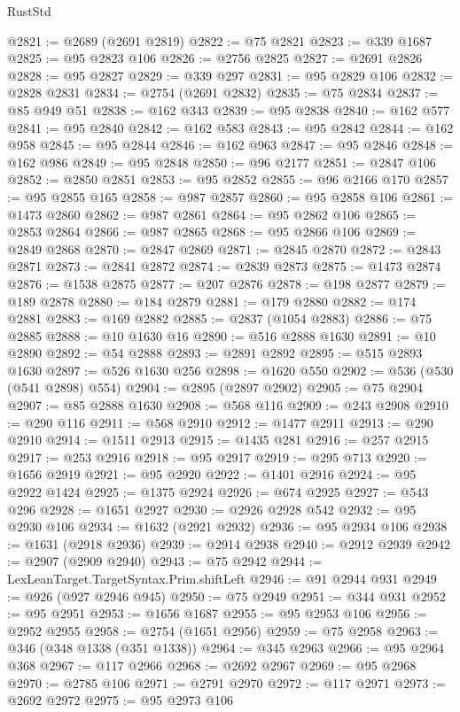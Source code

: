 \begin{lexlean}{RustStd}
\begin{coremodule}
{\begin{coremodule}
{{{{{{{{{{{{{{{{{{{{{{{{{{{{{{{{{{{{{{{@2821 := @2689 (@2691 @2819)
@2822 := @75 @2821
@2823 := @339 @1687
@2825 := @95 @2823 @106
@2826 := @2756 @2825
@2827 := @2691 @2826
@2828 := @95 @2827
@2829 := @339 @297
@2831 := @95 @2829 @106
@2832 := @2828 @2831
@2834 := @2754 (@2691 @2832)
@2835 := @75 @2834
@2837 := @85 @949 @51
@2838 := @162 @343
@2839 := @95 @2838
@2840 := @162 @577
@2841 := @95 @2840
@2842 := @162 @583
@2843 := @95 @2842
@2844 := @162 @958
@2845 := @95 @2844
@2846 := @162 @963
@2847 := @95 @2846
@2848 := @162 @986
@2849 := @95 @2848
@2850 := @96 @2177
@2851 := @2847 @106
@2852 := @2850 @2851
@2853 := @95 @2852
@2855 := @96 @2166 @170
@2857 := @95 @2855 @165
@2858 := @987 @2857
@2860 := @95 @2858 @106
@2861 := @1473 @2860
@2862 := @987 @2861
@2864 := @95 @2862 @106
@2865 := @2853 @2864
@2866 := @987 @2865
@2868 := @95 @2866 @106
@2869 := @2849 @2868
@2870 := @2847 @2869
@2871 := @2845 @2870
@2872 := @2843 @2871
@2873 := @2841 @2872
@2874 := @2839 @2873
@2875 := @1473 @2874
@2876 := @1538 @2875
@2877 := @207 @2876
@2878 := @198 @2877
@2879 := @189 @2878
@2880 := @184 @2879
@2881 := @179 @2880
@2882 := @174 @2881
@2883 := @169 @2882
@2885 := @2837 (@1054 @2883)
@2886 := @75 @2885
@2888 := @10 @1630 @16
@2890 := @516 @2888 @1630
@2891 := @10 @2890
@2892 := @54 @2888
@2893 := @2891 @2892
@2895 := @515 @2893 @1630
@2897 := @526 @1630 @256
@2898 := @1620 @550
@2902 := @536 (@530 (@541 @2898) @554)
@2904 := @2895 (@2897 @2902)
@2905 := @75 @2904
@2907 := @85 @2888 @1630
@2908 := @568 @116
@2909 := @243 @2908
@2910 := @290 @116
@2911 := @568 @2910
@2912 := @1477 @2911
@2913 := @290 @2910
@2914 := @1511 @2913
@2915 := @1435 @281
@2916 := @257 @2915
@2917 := @253 @2916
@2918 := @95 @2917
@2919 := @295 @713
@2920 := @1656 @2919
@2921 := @95 @2920
@2922 := @1401 @2916
@2924 := @95 @2922 @1424
@2925 := @1375 @2924
@2926 := @674 @2925
@2927 := @543 @296
@2928 := @1651 @2927
@2930 := @2926 @2928 @542
@2932 := @95 @2930 @106
@2934 := @1632 (@2921 @2932)
@2936 := @95 @2934 @106
@2938 := @1631 (@2918 @2936)
@2939 := @2914 @2938
@2940 := @2912 @2939
@2942 := @2907 (@2909 @2940)
@2943 := @75 @2942
@2944 := LexLeanTarget.TargetSyntax.Prim.shiftLeft
@2946 := @91 @2944 @931
@2949 := @926 (@927 @2946 @945)
@2950 := @75 @2949
@2951 := @344 @931
@2952 := @95 @2951
@2953 := @1656 @1687
@2955 := @95 @2953 @106
@2956 := @2952 @2955
@2958 := @2754 (@1651 @2956)
@2959 := @75 @2958
@2963 := @346 (@348 @1338 (@351 @1338))
@2964 := @345 @2963
@2966 := @95 @2964 @368
@2967 := @117 @2966
@2968 := @2692 @2967
@2969 := @95 @2968
@2970 := @2785 @106
@2971 := @2791 @2970
@2972 := @117 @2971
@2973 := @2692 @2972
@2975 := @95 @2973 @106
}}}}}}}}}}}}}}}}}}}}}}}}}}}}}}}}}}}}}}}
\end{coremodule}}
\end{coremodule}
\end{lexlean}
